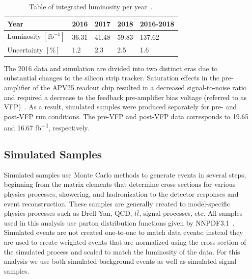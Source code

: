 \begin{table}[h]
	\centering
	\caption[Table of integrated luminosity per year.]{Table of integrated luminosity per year~\cite{cmslumi2016,cmslumi2017,cmslumi2018}.}
	\label{tab:intLumi}
	\begin{tabular}{l|l|l|l|l}\hline
		Year & 2016 & 2017 & 2018 & 2016-2018\\
		\hline
		\hline
		Luminosity $[\text{fb}^{-1}]$ & 36.31 & 41.48 & 59.83 & 137.62\\
		\hline	
		Uncertainty $[\%]$ & 1.2 & 2.3 & 2.5 & 1.6\\
		\hline
	\end{tabular}
\end{table}

The 2016 data and simulation are divided into two distinct eras due to substantial changes to the silicon strip tracker. Saturation effects in the pre-amplifier of the APV25 readout chip resulted in a decreased signal-to-noise ratio and required a decrease to the feedback pre-amplifier bias voltage (referred to as VFP)~\cite{CMS-DP-2020-045}. As a result, simulated samples were produced separately for pre- and post-VFP run conditions. The pre-VFP and post-VFP data corresponds to 19.65 and 16.67 \unit{fb^{-1}}, respectively.

\subsection{Simulated Samples} \label{sec:ana_mc}
Simulated samples use Monte Carlo methods to generate events in several steps, beginning from the matrix elements that determine cross sections for various physics processes, showering, and hadronization to the detector responses and event reconstruction. These samples are generally created to model-specific physics processes such as Drell-Yan, QCD, $t\bar{t}$, signal processes, etc. All samples used in this analysis use parton distribution functions given by NNPDF3.1~\cite{nnpdf3p1}. Simulated events are not created one-to-one to match data events; instead they are used to create weighted events that are normalized using the cross section of the simulated process and scaled to match the luminosity of the data. For this analysis we use both simulated background events as well as simulated signal samples.

